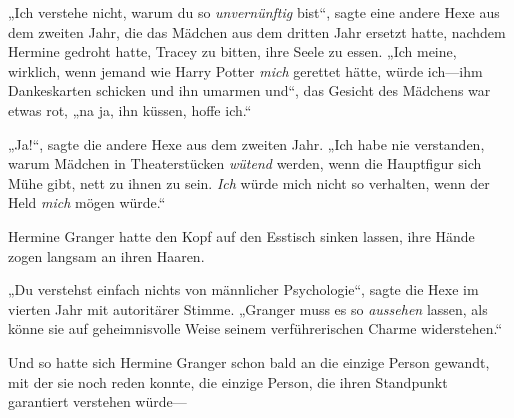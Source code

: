 „Ich verstehe nicht, warum du so \emph{unvernünftig} bist“, sagte eine andere Hexe aus dem zweiten Jahr, die das Mädchen aus dem dritten Jahr ersetzt hatte, nachdem Hermine gedroht hatte, Tracey zu bitten, ihre Seele zu essen. „Ich meine, wirklich, wenn jemand wie Harry Potter \emph{mich} gerettet hätte, würde ich—ihm Dankeskarten schicken und ihn umarmen und“, das Gesicht des Mädchens war etwas rot, „na ja, ihn küssen, hoffe ich.“

„Ja!“, sagte die andere Hexe aus dem zweiten Jahr. „Ich habe nie verstanden, warum Mädchen in Theaterstücken \emph{wütend} werden, wenn die Hauptfigur sich Mühe gibt, nett zu ihnen zu sein. \emph{Ich} würde mich nicht so verhalten, wenn der Held \emph{mich} mögen würde.“

Hermine Granger hatte den Kopf auf den Esstisch sinken lassen, ihre Hände zogen langsam an ihren Haaren.

„Du verstehst einfach nichts von männlicher Psychologie“, sagte die Hexe im vierten Jahr mit autoritärer Stimme. „Granger muss es so \emph{aussehen} lassen, als könne sie auf geheimnisvolle Weise seinem verführerischen Charme widerstehen.“


Und so hatte sich Hermine Granger schon bald an die einzige Person gewandt, mit der sie noch reden konnte, die einzige Person, die ihren Standpunkt garantiert verstehen würde—

